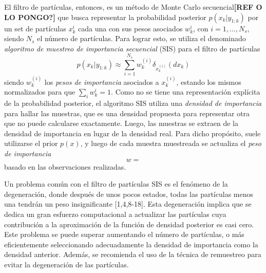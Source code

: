 El filtro de partículas, entonces, es un método de Monte Carlo secuencial\textbf{[REF O LO PONGO?]} que busca representar la probabilidad posterior $p(x_k|y_{1:k})$ por un set de partículas $x_k^i$ cada una con sus pesos asociados $w_k^i$, con $i=1,...,N_s$, siendo $N_s$ el número de partículas. Para lograr esto, se utiliza el denominado \textit{algoritmo de muestreo de importancia secuencial} (SIS) para el filtro de partículas
\begin{equation}
    p(x_k|y_{1:k}) \approx \sum_{i=1}^{N_s}w_k^{(i)}\delta_{x_k^{(i)}}(dx_k)
\end{equation}
siendo $w_k^{(i)}$ los \textit{pesos de importancia} asociados a $x_k^{(i)}$, estando los mismos normalizados para que $\sum_i w_k^i = 1$. Como no se tiene una representación explícita de la probabilidad posterior, el algoritmo SIS utiliza una \textit{densidad de importancia} para hallar las muestras, que es una densidad propuesta para representar otra que no puede calcularse exactamente. Luego, las muestras se extraen de la densidad de importancia en lugar de la densidad real. Para dicho propósito, suele utilizarse el prior $p(x)$, y luego de cada muestra muestreada se actualiza el \textit{peso de importancia}
\begin{equation}
    w = 
\end{equation}
basado en las observaciones realizadas.

Un problema común con el filtro de partículas SIS es el fenómeno de la degeneración, donde después de unos pocos estados, todas las partículas menos una tendrán un peso insignificante [1,4,8-18]. Esta degeneración implica que se dedica un gran esfuerzo computacional a actualizar las partículas cuya contribución a la aproximación de la función de densidad posterior es casi cero. Este problema se puede superar aumentando el número de partículas, o más eficientemente seleccionando adecuadamente la densidad de importancia como la densidad anterior. Además, se recomienda el uso de la técnica de remuestreo para evitar la degeneración de las partículas.